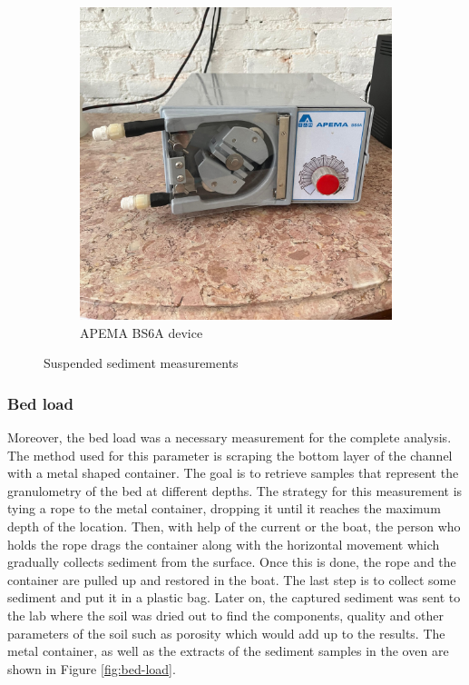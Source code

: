 \begin{figure}[H]
\begin{subfigure}[t]{0.48\textwidth}
        \includegraphics[width=\linewidth]{figures/ch4/APEMA BS6A.jpg}
        \caption{APEMA BS6A device}
    \end{subfigure}
    \caption{Suspended sediment measurements}
    \label{fig:suspended-sediment}
\end{figure}





\subsubsection{Bed load}
Moreover, the bed load was a necessary measurement for the complete analysis. The method used for this parameter is scraping the bottom layer of the channel with a metal shaped container. The goal is to retrieve samples that represent the granulometry of the bed at different depths. 
The strategy for this measurement is tying a rope to the metal container, dropping it until it reaches the maximum depth of the location. Then, with help of the current or the boat, the person who holds the rope drags the container along with the horizontal movement which gradually collects sediment from the surface. Once this is done, the rope and the container are pulled up and restored in the boat. The last step is to collect some sediment and put it in a plastic bag.  Later on, the captured sediment was sent to the lab where the soil was dried out to find the components, quality and other parameters of the soil such as porosity which would add up to the results. The metal container, as well as the extracts of the sediment samples in the oven are shown in Figure \ref{fig:bed-load}. 

